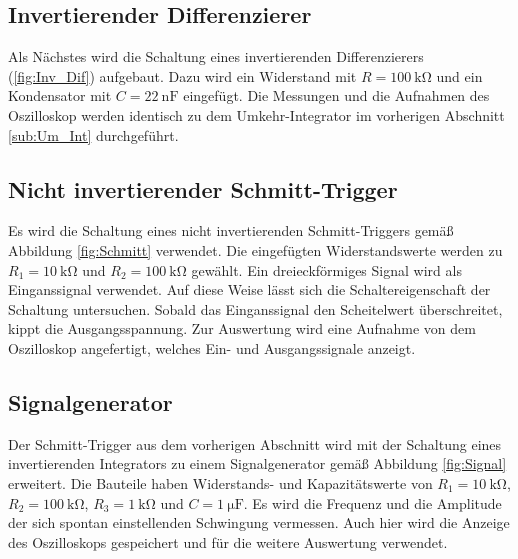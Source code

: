 \subsection{Invertierender Differenzierer}
Als Nächstes wird die Schaltung eines invertierenden Differenzierers (\ref{fig:Inv_Dif}) aufgebaut.
Dazu wird ein Widerstand mit $R=\SI{100}{\kilo\ohm}$ und ein Kondensator mit $C=\SI{22}{\nano\farad}$ eingefügt.
Die Messungen und die Aufnahmen des Oszilloskop werden identisch zu dem Umkehr-Integrator im vorherigen Abschnitt \ref{sub:Um_Int} durchgeführt.


\subsection{Nicht invertierender Schmitt-Trigger}
\label{sub:schmitt}
Es wird die Schaltung eines nicht invertierenden Schmitt-Triggers gemäß Abbildung \ref{fig:Schmitt} verwendet.
Die eingefügten Widerstandswerte werden zu $R_1=\SI{10}{\kilo\ohm}$ und $R_2=\SI{100}{\kilo\ohm}$ gewählt.
Ein dreieckförmiges Signal wird als Einganssignal verwendet.
Auf diese Weise lässt sich die Schaltereigenschaft der Schaltung untersuchen.
Sobald das Einganssignal den Scheitelwert überschreitet, kippt die Ausgangsspannung.
Zur Auswertung wird eine Aufnahme von dem Oszilloskop angefertigt, welches Ein- und Ausgangssignale anzeigt.


\subsection{Signalgenerator}
\label{sub:sig}
Der Schmitt-Trigger aus dem vorherigen Abschnitt wird mit der Schaltung eines invertierenden Integrators zu einem Signalgenerator gemäß Abbildung \ref{fig:Signal} erweitert.
Die Bauteile haben Widerstands- und Kapazitätswerte von $R_1=\SI{10}{\kilo\ohm}$, $R_2=\SI{100}{\kilo\ohm}$, $R_3=\SI{1}{\kilo\ohm}$ und $C=\SI{1}{\micro\farad}$.
Es wird die Frequenz und die Amplitude der sich spontan einstellenden Schwingung vermessen.
Auch hier wird die Anzeige des Oszilloskops gespeichert und für die weitere Auswertung verwendet.

